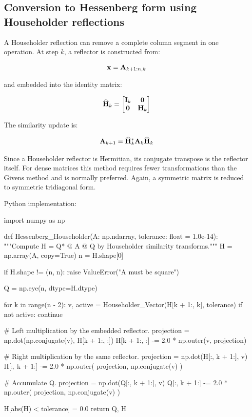 \subsection{Conversion to Hessenberg form using Householder reflections}

A Householder reflection can remove a complete column segment in one operation.
At step $ k $, a reflector is constructed from:

\begin{equation}
    \mathbf{x}=\mathbf{A}_{k+1:n,k}
\end{equation}

and embedded into the identity matrix:

\begin{equation}
    \widehat{\mathbf{H}}_k=
    \begin{bmatrix}
        \mathbf{I}_{k} & \mathbf{0} \\
        \mathbf{0} & \mathbf{H}_k
    \end{bmatrix}
\end{equation}

The similarity update is:

\begin{equation}
    \mathbf{A}_{k+1}=\widehat{\mathbf{H}}_k^{*}\mathbf{A}_k\widehat{\mathbf{H}}_k
\end{equation}

Since a Householder reflector is Hermitian, its conjugate transpose is the
reflector itself. For dense matrices this method requires fewer transformations
than the Givens method and is normally preferred. Again, a symmetric matrix is
reduced to symmetric tridiagonal form.

Python implementation:

\begin{python}
import numpy as np


def Hessenberg_Householder(A: np.ndarray,
                           tolerance: float = 1.0e-14):
    """Compute H = Q* @ A @ Q by Householder similarity transforms."""
    H = np.array(A, copy=True)
    n = H.shape[0]

    if H.shape != (n, n):
        raise ValueError("A must be square")

    Q = np.eye(n, dtype=H.dtype)

    for k in range(n - 2):
        v, active = Householder_Vector(H[k + 1:, k], tolerance)
        if not active:
            continue

        # Left multiplication by the embedded reflector.
        projection = np.dot(np.conjugate(v), H[k + 1:, :])
        H[k + 1:, :] -= 2.0 * np.outer(v, projection)

        # Right multiplication by the same reflector.
        projection = np.dot(H[:, k + 1:], v)
        H[:, k + 1:] -= 2.0 * np.outer(
            projection, np.conjugate(v)
        )

        # Accumulate Q.
        projection = np.dot(Q[:, k + 1:], v)
        Q[:, k + 1:] -= 2.0 * np.outer(
            projection, np.conjugate(v)
        )

    H[abs(H) < tolerance] = 0.0
    return Q, H
\end{python}

